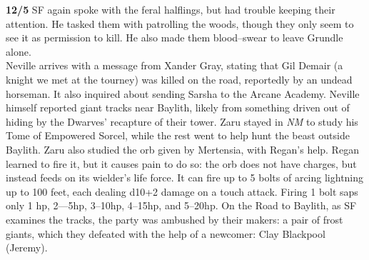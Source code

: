 \documentclass[letterpaper]{article}
\begin{document}
\noindent\textbf{12/5} SF again spoke with the feral halflings, but had trouble keeping their attention.  He tasked them with patrolling the woods, though they only seem to see it as permission to kill. He also made them blood--swear to leave Grundle alone.\\

\noindent Neville arrives with a message from Xander Gray, stating that Gil Demair (a knight we met at the tourney) was killed on the road, reportedly by an undead horseman. It also inquired about sending Sarsha to the Arcane Academy.  Neville himself reported giant tracks near Baylith, likely from something driven out of hiding by the Dwarves' recapture of their tower.  Zaru stayed in \emph{NM} to study his Tome of Empowered Sorcel, while the rest went to help hunt the beast outside Baylith. Zaru also studied the orb given by Mertensia, with Regan's help.  Regan learned to fire it, but it causes pain to do so: the orb does not have charges, but instead feeds on its wielder's life force.  It can fire up to 5 bolts of arcing lightning up to 100 feet, each dealing d10+2 damage on a touch attack.  Firing 1 bolt saps only 1 hp, 2---5hp, 3--10hp, 4--15hp, and 5--20hp.  On the Road to Baylith, as SF examines the tracks, the party was ambushed by their makers: a pair of frost giants, which they defeated with the help of a newcomer: Clay Blackpool (Jeremy).  \\
\end{document}
